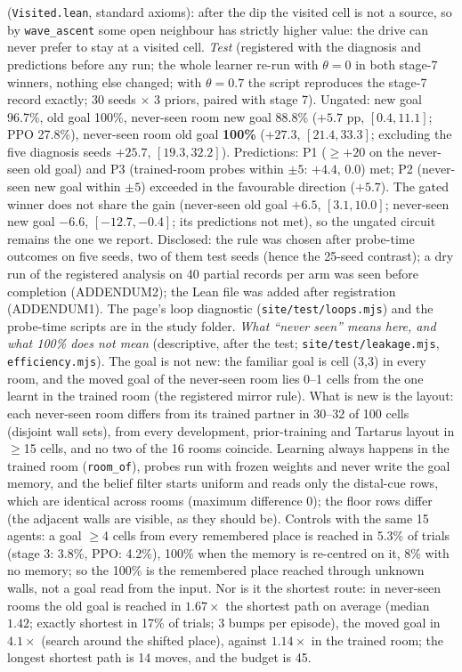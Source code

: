 \documentclass[10pt,onecolumn,letterpaper]{article}
\begin{document}
(\texttt{Visited.lean}, standard axioms): after the dip the visited cell is not a source, so by \texttt{wave\_ascent} some open
neighbour has strictly higher value: the drive can never prefer to stay at a visited cell. \emph{Test} (registered with the
diagnosis and predictions before any run; the whole learner re-run with $\theta=0$ in both stage-7 winners, nothing else changed;
with $\theta=0.7$ the script reproduces the stage-7 record exactly; 30 seeds $\times$ 3 priors, paired with stage 7). Ungated: new
goal 96.7\%, old goal 100\%, never-seen room new goal 88.8\% ($+5.7$ pp, $[0.4,11.1]$; PPO 27.8\%), never-seen room old goal
\textbf{100\%} ($+27.3$, $[21.4,33.3]$; excluding the five diagnosis seeds $+25.7$, $[19.3,32.2]$). Predictions: P1 ($\ge+20$ on
the never-seen old goal) and P3 (trained-room probes within $\pm5$: $+4.4$, $0.0$) met; P2 (never-seen new goal within $\pm5$)
exceeded in the favourable direction ($+5.7$). The gated winner does not share the gain (never-seen old goal $+6.5$, $[3.1,10.0]$;
never-seen new goal $-6.6$, $[-12.7,-0.4]$; its predictions not met), so the ungated circuit remains the one we report. Disclosed:
the rule was chosen after probe-time outcomes on five seeds, two of them test seeds (hence the 25-seed contrast); a dry run of the
registered analysis on 40 partial records per arm was seen before completion (ADDENDUM2); the Lean file was added after
registration (ADDENDUM1). The page's loop diagnostic (\texttt{site/test/loops.mjs}) and the probe-time scripts are in the study
folder.
\emph{What ``never seen'' means here, and what 100\% does not mean} (descriptive, after the test; \texttt{site/test/leakage.mjs},
\texttt{efficiency.mjs}). The goal is not new: the familiar goal is cell (3,3) in every room, and the moved goal of the never-seen
room lies 0--1 cells from the one learnt in the trained room (the registered mirror rule). What is new is the layout: each
never-seen room differs from its trained partner in 30--32 of 100 cells (disjoint wall sets), from every development, prior-training
and Tartarus layout in $\geq$15 cells, and no two of the 16 rooms coincide. Learning always happens in the trained room
(\texttt{room\_of}), probes run with frozen weights and never write the goal memory, and the belief filter starts uniform and reads
only the distal-cue rows, which are identical across rooms (maximum difference $0$); the floor rows differ (the adjacent walls are
visible, as they should be). Controls with the same 15 agents: a goal $\geq$4 cells from every remembered place is reached in 5.3\%
of trials (stage 3: 3.8\%, PPO: 4.2\%), 100\% when the memory is re-centred on it, 8\% with no memory; so the 100\% is the
remembered place reached through unknown walls, not a goal read from the input. Nor is it the shortest route: in never-seen rooms the
old goal is reached in $1.67\times$ the shortest path on average (median $1.42$; exactly shortest in 17\% of trials; 3 bumps per
episode), the moved goal in $4.1\times$ (search around the shifted place), against $1.14\times$ in the trained room; the longest
shortest path is 14 moves, and the budget is 45.
\end{document}
